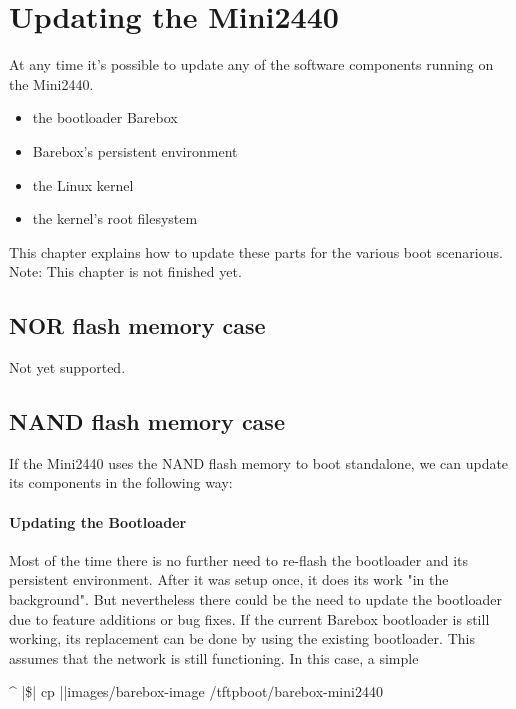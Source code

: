
\chapter{Updating the Mini2440}	\label{sec:updating}

At any time it's possible to update any of the software components
running on the Mini2440.

\begin{itemize}
	\item the bootloader Barebox
	\item Barebox's persistent environment
	\item the Linux kernel
	\item the kernel's root filesystem
\end{itemize}

This chapter explains how to update these parts for the various boot scenarious.
Note: This chapter is not finished yet.

\section{NOR flash memory case}

Not yet supported.

\section{NAND flash memory case}

If the Mini2440 uses the NAND flash memory to boot standalone, we can update
its components in the following way:

\subsubsection{Updating the Bootloader}

Most of the time there is no further need to re-flash the bootloader and its
persistent environment. After it was setup once, it does its work "in the
background". But nevertheless there could be the need to update the bootloader
due to feature additions or bug fixes. If the current Barebox bootloader is
still working, its replacement can be done by using the existing bootloader.
This assumes that the network is still functioning. In this case, a simple

\begin{ptxshell}[escapechar=|]{^}
|\$| cp |\ptxdistPlatformDir |images/barebox-image /tftpboot/barebox-mini2440
\end{ptxshell}

